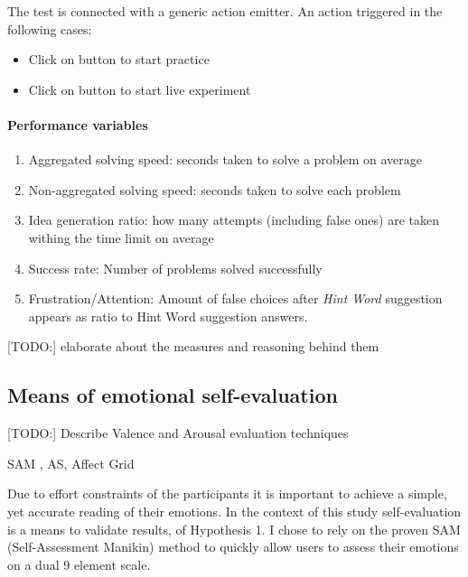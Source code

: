 		The test is connected with a generic action emitter. An action triggered in the following cases:
		
		\begin{itemize}
			\item Click on button to start practice
			\item Click on button to start live experiment
		\end{itemize}
	

		\paragraph{Performance variables} \label{sec:creativity-parameters}
		
		\begin{enumerate}
			\item Aggregated solving speed: seconds taken to solve a problem on average
			\item Non-aggregated solving speed: seconds taken to solve each problem
			\item Idea generation ratio: how many attempts (including false ones) are taken withing the time limit on average
			\item Success rate: Number of problems solved successfully
			\item Frustration/Attention: Amount of false choices after \textit{Hint Word} suggestion appears as ratio to Hint Word suggestion answers.
		\end{enumerate}
	
		[TODO:] elaborate about the measures and reasoning behind them


	\subsection{Means of emotional self-evaluation} \label{sec:selfeval}
	
	
	
	[TODO:] Describe Valence and Arousal evaluation techniques
	
	SAM , AS, Affect Grid \cite{Russell1989}
	
	Due to effort constraints of the participants it is important to achieve a simple, yet accurate reading of their emotions. In the context of this study self-evaluation is a means to validate results, of Hypothesis 1. I chose to rely on the proven SAM (Self-Assessment Manikin) method \cite{Bradley1994} to quickly allow users to assess their emotions on a dual 9 element scale.
	
